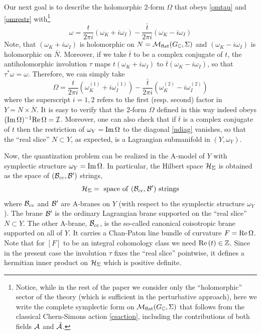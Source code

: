 \documentclass[hyper]{JHEP3}
\renewcommand{\Im}{{\rm Im}\,}
\renewcommand{\Re}{{\rm Re}\,}
\def\CA {{\cal A}}
\def\CB {{\cal B}}
\def\CH {{\cal H}}
\def\CI {{\cal I}}
\newcommand{\C}{{\mathbb{C}}}
\newcommand{\Z}{{\mathbb{Z}}}
\newcommand{\M}{{{\cal M}}_{{\rm flat}}}
\newcommand\be{\begin{equation}}
\newcommand\ee{\end{equation}}
\begin{document}
Our next goal is to describe the holomorphic 2-form $\Omega$
that obeys \eqref{omtau} and \eqref{omrestr} with\footnote{Notice,
while in the rest of the paper we consider only the ``holomorphic'' sector
of the theory (which is sufficient in the perturbative approach),
here we write the complete symplectic form on $\M (G_{\C},\Sigma)$
that follows from the classical Chern-Simons action \eqref{csaction},
including the contributions of both fields $\CA$ and $\bar \CA$.}
\be
\omega = \frac{t}{2\pi i} (\omega_K + i \omega_I) - \frac{\bar t}{2\pi i} (\omega_K - i \omega_I)
\ee
Note, that $(\omega_K + i \omega_I)$ is holomorphic on $N = \M (G_{\C},\Sigma)$
and $(\omega_K - i \omega_I)$ is holomorphic on $\overline{N}$.
Moreover, if we take $\bar t$ to be a complex conjugate of $t$, the antiholomorphic
involution $\tau$ maps $t (\omega_K + i \omega_I)$ to $\bar t (\omega_K - i \omega_I)$,
so that $\tau^* \omega = \omega$.
Therefore, we can simply take
\be
\Omega = \frac{t}{2\pi i} (\omega_K^{(1)} + i \omega_I^{(1)}) - \frac{\bar t}{2\pi i} (\omega_K^{(2)} - i \omega_I^{(2)})
\ee
where the superscript $i=1,2$ refers to the first (resp. second) factor in $Y = N \times \overline{N}$.
It is easy to verify that the 2-form $\Omega$ defined in this way indeed obeys $(\Im \Omega)^{-1} \Re \Omega = \CI$.
Moreover, one can also check that if $\bar t$ is a complex conjugate of $t$
then the restriction of $\omega_Y = \Im \Omega$
to the diagonal \eqref{ndiag} vanishes, so that the ``real slice'' $N \subset Y$,
as expected, is a Lagrangian submanifold in $(Y,\omega_Y)$.


Now, the quantization problem can be realized in the A-model of $Y$
with symplectic structure $\omega_Y = \Im \Omega$. In particular,
the Hilbert space $\CH_{\Sigma}$ is obtained as the space of $(\CB_{cc},\CB')$ strings,
\be
\CH_{\Sigma} = {\rm ~space~of~} (\CB_{cc},\CB') {\rm ~strings}
\ee
where $\CB_{cc}$ and $\CB'$ are A-branes on $Y$ (with respect to the symplectic structure $\omega_Y$).
The brane $\CB'$ is the ordinary Lagrangian brane supported on
the ``real slice'' $N \subset Y$.
The other A-brane, $\CB_{cc}$, is the so-called canonical coisotropic brane
supported on all of $Y$. It carries a Chan-Paton line bundle of curvature $F = \Re \Omega$.
Note that for $[F]$ to be an integral cohomology class we need $\Re (t) \in \Z$.
Since in the present case the involution $\tau$ fixes the ``real slice'' pointwise,
it defines a hermitian inner product on $\CH_{\Sigma}$ which is positive definite.


\end{document}
